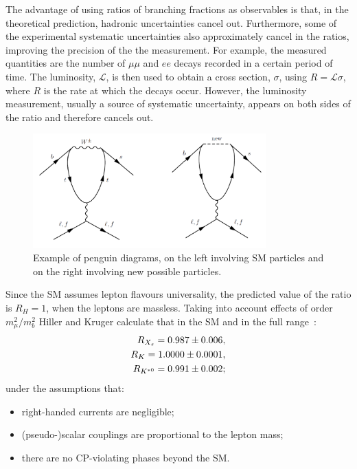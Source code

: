 
The advantage of using ratios of branching fractions as observables is that, in the theoretical prediction, hadronic 
uncertainties cancel out. Furthermore, some of the experimental systematic uncertainties also approximately cancel in 
the ratios, improving the precision of the the measurement. For example, the measured quantities are the number of 
$\mu\mu$ and $ee$ decays recorded in a certain period of time. The luminosity, $\mathcal{L}$, is then used to obtain a
cross section, $\sigma$, using $R = \mathcal{L}\sigma$, where $R$ is the rate at which the decays occur. 
However, the luminosity measurement, usually a source of systematic uncertainty, appears on both
sides of the ratio and therefore cancels out.

\begin{figure}[h]
\centering \includegraphics[width=0.8\textwidth]{RKst/figs/penguins.png}
\caption{Example of penguin diagrams, on the left involving SM particles and on the right 
involving new possible particles.}
\label{fig:NPpenguins}
\end{figure}

Since the SM assumes lepton flavours universality, the predicted value of the ratio 
is $R_H = 1$, when the leptons are massless. Taking into account effects of order 
$m_\mu^2 / m_b^2$ Hiller and Kruger calculate that in the SM and in the full \qsq range~\cite{Hiller:2003js}:
%
\begin{align}
R_{X_s} = 0.987 \pm 0.006, \\
R_K = 1.0000 \pm 0.0001, \\
R_{{{K}^{*0}}} = 0.991 \pm 0.002; \\
\end{align}
%
\noindent
under the assumptions that:
%
\begin{itemize}
\item right-handed currents are negligible;
\item (pseudo-)scalar couplings are proportional to the lepton mass;
\item there are no CP-violating phases beyond the SM.
\end{itemize}


